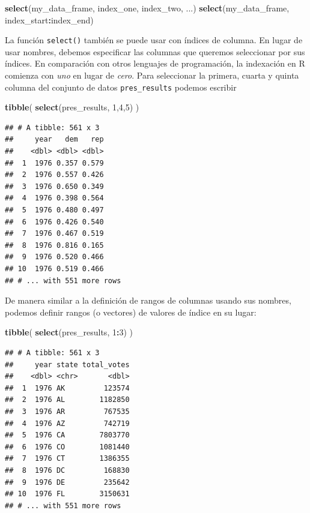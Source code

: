 \documentclass[
]{book}
\newenvironment{Shaded}{\begin{snugshade}}{\end{snugshade}}
\newcommand{\DecValTok}[1]{\textcolor[rgb]{0.00,0.00,0.81}{#1}}
\newcommand{\KeywordTok}[1]{\textcolor[rgb]{0.13,0.29,0.53}{\textbf{#1}}}
\newcommand{\NormalTok}[1]{#1}
\newcommand{\OperatorTok}[1]{\textcolor[rgb]{0.81,0.36,0.00}{\textbf{#1}}}
\begin{document}
\begin{Shaded}
\begin{Highlighting}[]
\KeywordTok{select}\NormalTok{(my_data_frame, index_one, index_two, ...)}
\KeywordTok{select}\NormalTok{(my_data_frame, index_start}\OperatorTok{:}\NormalTok{index_end)}
\end{Highlighting}
\end{Shaded}

La función \texttt{select()} también se puede usar con índices de columna. En lugar de usar nombres, debemos especificar las columnas que queremos seleccionar por sus índices. En comparación con otros lenguajes de programación, la indexación en R comienza con \emph{uno} en lugar de \emph{cero}. Para seleccionar la primera, cuarta y quinta columna del conjunto de datos \texttt{pres\_results} podemos escribir

\begin{Shaded}
\begin{Highlighting}[]
\KeywordTok{tibble}\NormalTok{(}
\KeywordTok{select}\NormalTok{(pres_results, }\DecValTok{1}\NormalTok{,}\DecValTok{4}\NormalTok{,}\DecValTok{5}\NormalTok{)}
\NormalTok{)}
\end{Highlighting}
\end{Shaded}

\begin{verbatim}
## # A tibble: 561 x 3
##     year   dem   rep
##    <dbl> <dbl> <dbl>
##  1  1976 0.357 0.579
##  2  1976 0.557 0.426
##  3  1976 0.650 0.349
##  4  1976 0.398 0.564
##  5  1976 0.480 0.497
##  6  1976 0.426 0.540
##  7  1976 0.467 0.519
##  8  1976 0.816 0.165
##  9  1976 0.520 0.466
## 10  1976 0.519 0.466
## # ... with 551 more rows
\end{verbatim}

De manera similar a la definición de rangos de columnas usando sus nombres, podemos definir rangos (o vectores) de valores de índice en su lugar:

\begin{Shaded}
\begin{Highlighting}[]
\KeywordTok{tibble}\NormalTok{(}
\KeywordTok{select}\NormalTok{(pres_results, }\DecValTok{1}\OperatorTok{:}\DecValTok{3}\NormalTok{)}
\NormalTok{)}
\end{Highlighting}
\end{Shaded}

\begin{verbatim}
## # A tibble: 561 x 3
##     year state total_votes
##    <dbl> <chr>       <dbl>
##  1  1976 AK         123574
##  2  1976 AL        1182850
##  3  1976 AR         767535
##  4  1976 AZ         742719
##  5  1976 CA        7803770
##  6  1976 CO        1081440
##  7  1976 CT        1386355
##  8  1976 DC         168830
##  9  1976 DE         235642
## 10  1976 FL        3150631
## # ... with 551 more rows
\end{verbatim}
\end{document}
